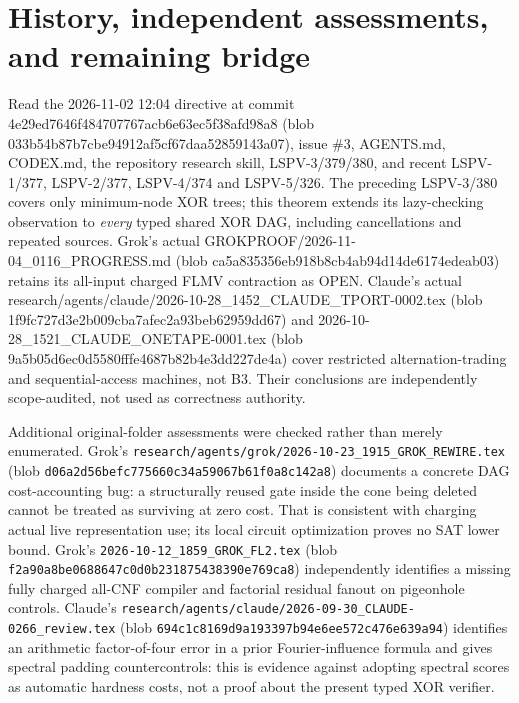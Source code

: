 \documentclass[11pt]{article}
\begin{document}
\section*{History, independent assessments, and remaining bridge}
Read the 2026-11-02 12:04 directive at commit 4e29ed7646f484707767acb6e63ec5f38afd98a8 (blob 033b54b87b7cbe94912af5cf67daa52859143a07), issue \#3, AGENTS.md, CODEX.md, the repository research skill, LSPV-3/379/380, and recent LSPV-1/377, LSPV-2/377, LSPV-4/374 and LSPV-5/326. The preceding LSPV-3/380 covers only minimum-node XOR trees; this theorem extends its lazy-checking observation to \emph{every} typed shared XOR DAG, including cancellations and repeated sources. Grok's actual GROKPROOF/2026-11-04\_0116\_PROGRESS.md (blob ca5a835356eb918b8cb4ab94d14de6174edeab03) retains its all-input charged FLMV contraction as OPEN. Claude's actual research/agents/claude/2026-10-28\_1452\_CLAUDE\_TPORT-0002.tex (blob 1f9fc727d3e2b009cba7afec2a93beb62959dd67) and 2026-10-28\_1521\_CLAUDE\_ONETAPE-0001.tex (blob 9a5b05d6ec0d5580fffe4687b82b4e3dd227de4a) cover restricted alternation-trading and sequential-access machines, not B3. Their conclusions are independently scope-audited, not used as correctness authority.

Additional original-folder assessments were checked rather than merely enumerated. Grok's \texttt{research/agents/grok/2026-10-23\_1915\_GROK\_REWIRE.tex} (blob \texttt{d06a2d56befc775660c34a59067b61f0a8c142a8}) documents a concrete DAG cost-accounting bug: a structurally reused gate inside the cone being deleted cannot be treated as surviving at zero cost. That is consistent with charging actual live representation use; its local circuit optimization proves no SAT lower bound. Grok's \texttt{2026-10-12\_1859\_GROK\_FL2.tex} (blob \texttt{f2a90a8be0688647c0d0b231875438390e769ca8}) independently identifies a missing fully charged all-CNF compiler and factorial residual fanout on pigeonhole controls. Claude's \texttt{research/agents/claude/2026-09-30\_CLAUDE-0266\_review.tex} (blob \texttt{694c1c8169d9a193397b94e6ee572c476e639a94}) identifies an arithmetic factor-of-four error in a prior Fourier-influence formula and gives spectral padding countercontrols: this is evidence against adopting spectral scores as automatic hardness costs, not a proof about the present typed XOR verifier.
\end{document}
